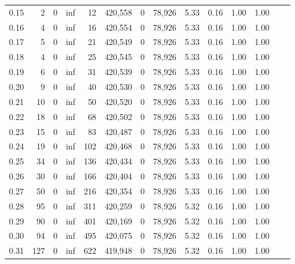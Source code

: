 \begin{tabular}{rrrrrrrrrrrrrr}
0.15 &       2 &      0 &     inf &       12 &  420,558 &       0 &  78,926 &  5.33 &  0.16 &  1.00 &      1.00 \\
0.16 &       4 &      0 &     inf &       16 &  420,554 &       0 &  78,926 &  5.33 &  0.16 &  1.00 &      1.00 \\
0.17 &       5 &      0 &     inf &       21 &  420,549 &       0 &  78,926 &  5.33 &  0.16 &  1.00 &      1.00 \\
0.18 &       4 &      0 &     inf &       25 &  420,545 &       0 &  78,926 &  5.33 &  0.16 &  1.00 &      1.00 \\
0.19 &       6 &      0 &     inf &       31 &  420,539 &       0 &  78,926 &  5.33 &  0.16 &  1.00 &      1.00 \\
0.20 &       9 &      0 &     inf &       40 &  420,530 &       0 &  78,926 &  5.33 &  0.16 &  1.00 &      1.00 \\
0.21 &      10 &      0 &     inf &       50 &  420,520 &       0 &  78,926 &  5.33 &  0.16 &  1.00 &      1.00 \\
0.22 &      18 &      0 &     inf &       68 &  420,502 &       0 &  78,926 &  5.33 &  0.16 &  1.00 &      1.00 \\
0.23 &      15 &      0 &     inf &       83 &  420,487 &       0 &  78,926 &  5.33 &  0.16 &  1.00 &      1.00 \\
0.24 &      19 &      0 &     inf &      102 &  420,468 &       0 &  78,926 &  5.33 &  0.16 &  1.00 &      1.00 \\
0.25 &      34 &      0 &     inf &      136 &  420,434 &       0 &  78,926 &  5.33 &  0.16 &  1.00 &      1.00 \\
0.26 &      30 &      0 &     inf &      166 &  420,404 &       0 &  78,926 &  5.33 &  0.16 &  1.00 &      1.00 \\
0.27 &      50 &      0 &     inf &      216 &  420,354 &       0 &  78,926 &  5.33 &  0.16 &  1.00 &      1.00 \\
0.28 &      95 &      0 &     inf &      311 &  420,259 &       0 &  78,926 &  5.32 &  0.16 &  1.00 &      1.00 \\
0.29 &      90 &      0 &     inf &      401 &  420,169 &       0 &  78,926 &  5.32 &  0.16 &  1.00 &      1.00 \\
0.30 &      94 &      0 &     inf &      495 &  420,075 &       0 &  78,926 &  5.32 &  0.16 &  1.00 &      1.00 \\
0.31 &     127 &      0 &     inf &      622 &  419,948 &       0 &  78,926 &  5.32 &  0.16 &  1.00 &      1.00 \\

\end{tabular}
